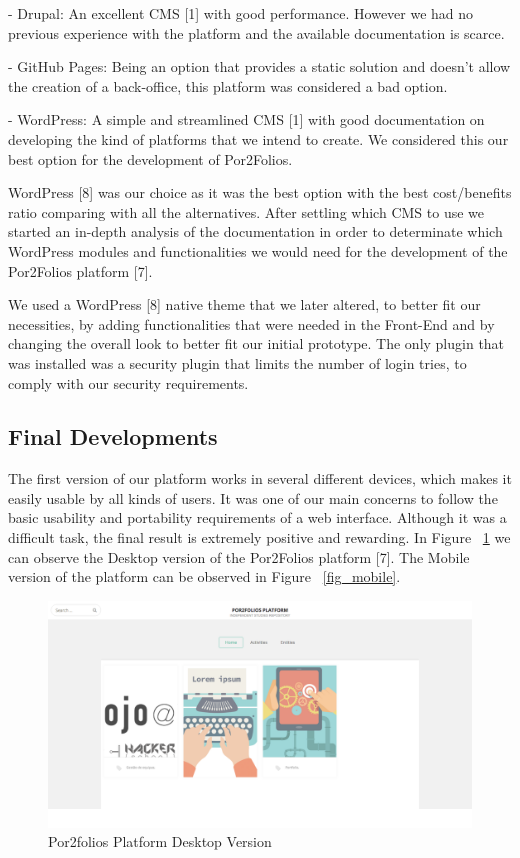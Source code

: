 \documentclass[a4paper,12pt,journal,twoside,compsoc]{PPIEEEtran}
\begin{document}
- Drupal: An excellent \ac{CMS} [1] with good performance. However we had no previous experience with the platform and the available documentation is scarce.

- GitHub Pages: Being an option that provides a static solution and doesn't allow the creation of a back-office, this platform was considered a bad option.

- WordPress: A simple and streamlined \ac{CMS} [1] with good documentation on developing the kind of platforms that we intend to create. We considered this our best option for the development of Por2Folios.

WordPress [8] was our choice as it was the best option with the best cost/benefits ratio comparing with all the alternatives. After settling which \ac{CMS} to use we started an in-depth analysis of the documentation in order to determinate which WordPress modules and functionalities we would need for the development of the Por2Folios platform [7].

We used a WordPress [8] native theme that we later altered, to better fit our necessities, by adding functionalities that were needed in the Front-End and by changing the overall look to better fit our initial prototype. The only plugin that was installed was a security plugin that limits the number of login tries, to comply with our security requirements.

\clearpage

\subsection{Final Developments}

The first version of our platform works in several different devices, which makes it easily usable by all kinds of users. It was one of our main concerns to follow the basic usability and portability requirements of a web interface. Although it was a difficult task, the final result is extremely positive and rewarding. In Figure ~\ref{fig_browser} we can observe the Desktop version of the Por2Folios platform [7]. The Mobile version of the platform can be observed in Figure ~\ref{fig_mobile}.

\begin{figure}[htb]
\centering
\includegraphics[width=1\linewidth]{desktop.png}
\caption{Por2folios Platform Desktop Version}
\label{fig_browser}
\end{figure}
\end{document}
